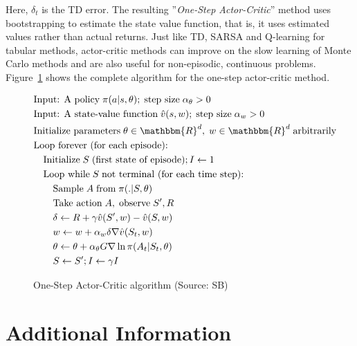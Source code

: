 Here, $\delta_t$ is the TD error. The resulting ''\emph{One-Step Actor-Critic}'' method uses bootstrapping to estimate the state value function, that is, it uses estimated values rather than actual returns. Just like TD, SARSA and Q-learning for tabular methods, actor-critic methods can improve on the slow learning of Monte Carlo methods and are also useful for non-episodic, continuous problems. Figure~\ref{fig:actorcritic} shows the complete algorithm for the one-step actor-critic method.

\begin{figure}
\small
\begin{pseudocodebox}
\vspace{-\baselineskip}
\vspace{-.5\baselineskip}
\begin{align*}
& \text{Input: A policy}\;\pi(a | s, \theta);\;\text{step size}\; \alpha_\theta > 0 \\
& \text{Input: A state-value function}\;\hat{v}(s, w);\;\text{step size}\; \alpha_w > 0 \hspace{1in} \\
& \text{Initialize parameters}\; \theta \in \mathbbm{R}^d,\; w \in \mathbbm{R}^d\;\text{arbitrarily} \\
& \text{Loop forever (for each episode):} \\
& \quad \text{Initialize}\;S\;\text{(first state of episode)}; I \leftarrow 1 \\
& \quad \text{Loop while}\;S\;\text{not terminal (for each time step):} \\
& \quad \quad \text{Sample}\;A\;\text{from}\; \pi(.|S, \theta) \\
& \quad \quad \text{Take action}\;A,\;\text{observe}\;S', R \\
& \quad \quad \delta \leftarrow R + \gamma \hat{v}(S', w) - \hat{v}(S, w) \\
& \quad \quad w \leftarrow w + \alpha_w \delta \nabla \hat{v}(S_t, w) \\
& \quad \quad \theta \leftarrow \theta + \alpha_\theta G \nabla \ln \pi(A_t | S_t, \theta) \\
& \quad \quad S \leftarrow S'; I \leftarrow \gamma I
\end{align*}
\end{pseudocodebox}
\caption[One-Step Actor-Critic algorithm]{One-Step Actor-Critic algorithm (Source: SB)}
\label{fig:actorcritic}
\end{figure}

\section{Additional Information}


